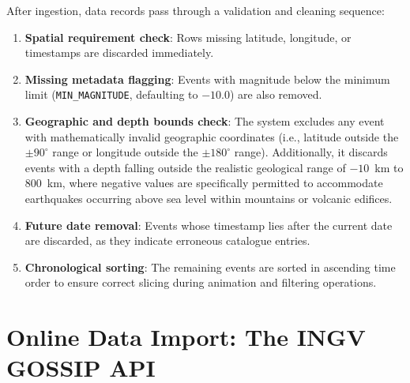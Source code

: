After ingestion, data records pass through a validation and cleaning sequence:
\begin{enumerate}
    \item \textbf{Spatial requirement check}: Rows missing latitude, longitude, or timestamps are discarded immediately.
    \item \textbf{Missing metadata flagging}:  Events with magnitude below the minimum limit (\texttt{MIN\_MAGNITUDE}, defaulting to $-10.0$) are also removed.
    \item \textbf{Geographic and depth bounds check}: The system excludes any event with mathematically invalid geographic coordinates (i.e., latitude outside the $\pm 90^\circ$ range or longitude outside the $\pm 180^\circ$ range). Additionally, it discards events with a depth falling outside the realistic geological range of $-10$~km to $800$~km, where negative values are specifically permitted to accommodate earthquakes occurring above sea level within mountains or volcanic edifices.
    \item \textbf{Future date removal}: Events whose timestamp lies after the current date are discarded, as they indicate erroneous catalogue entries.
    \item \textbf{Chronological sorting}: The remaining events are sorted in ascending time order to ensure correct slicing during animation and filtering operations.
\end{enumerate}

\section{Online Data Import: The INGV GOSSIP API}
\label{sec:online-import}

